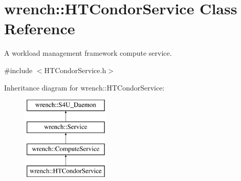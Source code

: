 \hypertarget{classwrench_1_1_h_t_condor_service}{}\section{wrench\+:\+:H\+T\+Condor\+Service Class Reference}
\label{classwrench_1_1_h_t_condor_service}


A workload management framework compute service.  




{\ttfamily \#include $<$H\+T\+Condor\+Service.\+h$>$}

Inheritance diagram for wrench\+:\+:H\+T\+Condor\+Service\+:\begin{figure}[H]
\begin{center}
\leavevmode
\includegraphics[height=4.000000cm]{classwrench_1_1_h_t_condor_service}
\end{center}
\end{figure}

